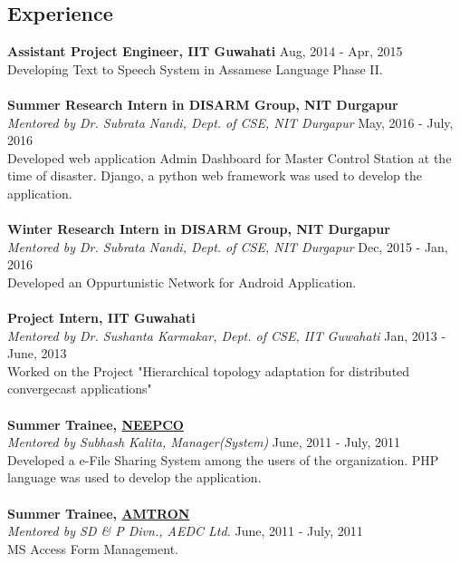 \documentclass[margin, centered]{res}
\begin{document}
\begin{resume}
\section{Experience}
\textbf{Assistant Project Engineer, IIT Guwahati} \hfill Aug, 2014 - Apr, 2015\\
Developing Text to Speech System in Assamese Language Phase II. \\
\\
\textbf{Summer Research Intern in DISARM Group, NIT Durgapur} \href{http://nitdgp.ac.in/MCN-RG/mcn-rg.html} \\
\emph{Mentored by {Dr. Subrata Nandi, Dept. of CSE, NIT Durgapur}} \hfill May, 2016 - July, 2016 \\
Developed web application Admin Dashboard for Master Control Station at the time of disaster. Django, a python web framework was used to develop the application.\\
\\
\textbf{Winter Research Intern in DISARM Group, NIT Durgapur} \href{http://nitdgp.ac.in/MCN-RG/mcn-rg.html} \\
\emph{Mentored by {Dr. Subrata Nandi, Dept. of CSE, NIT Durgapur}} \hfill Dec, 2015 - Jan, 2016 \\
Developed an Oppurtunistic Network for Android Application.
\\
\\
\textbf{Project Intern, IIT Guwahati}  \\
\emph{Mentored by {Dr. Sushanta Karmakar, Dept. of CSE, IIT Guwahati}} \hfill Jan, 2013 - June, 2013 \\
Worked on the Project "Hierarchical topology adaptation for distributed convergecast applications"
\\
\\
\textbf{Summer Trainee, \href{http://neepco.co.in/neepco/}{NEEPCO}} \\
\emph{Mentored by {Subhash Kalita, Manager(System)}} \hfill June, 2011 - July, 2011 \\
Developed a e-File Sharing System among the users of the organization. PHP language was used to develop the application.
\\
\\
\textbf{Summer Trainee, \href{http://amtron.in/}{AMTRON}}  \\
\emph{Mentored by {SD \& P Divn., AEDC Ltd.}} \hfill June, 2011 - July, 2011 \\
MS Access Form Management.
\\
\\


\end{resume}
\end{document}
